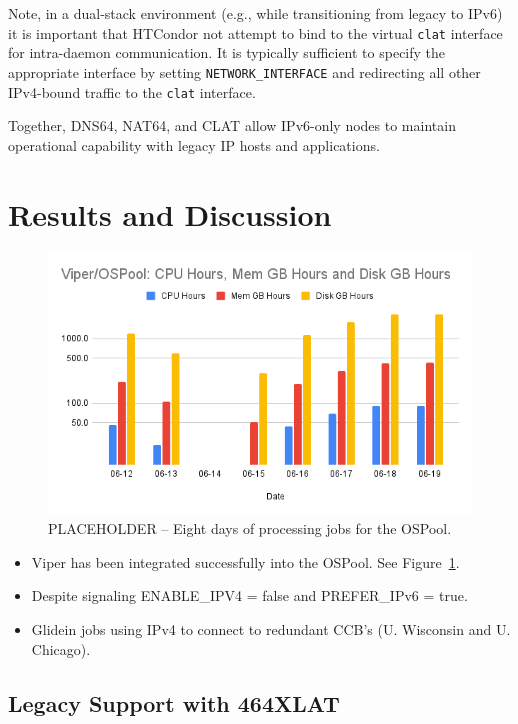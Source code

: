 \documentclass[11pt]{article}
\begin{document}
Note, in a dual-stack environment (e.g., while transitioning from legacy to IPv6) it is important that HTCondor not attempt to bind to the virtual \texttt{clat} interface for intra-daemon communication. It is typically sufficient to specify the appropriate interface by setting \texttt{NETWORK\_INTERFACE} and redirecting all other IPv4-bound traffic to the \texttt{clat} interface.  


Together, DNS64, NAT64, and CLAT allow IPv6-only nodes to maintain operational capability with legacy IP hosts and applications. 

\section{Results and Discussion}

\begin{figure}[htbp]
  \centering
  \includegraphics[width=0.74\linewidth]{Viper_OSPool_utilization.png}
  \caption{PLACEHOLDER -- Eight days of processing jobs for the OSPool.}
  \label{fig:viper-jobs}
\end{figure}


\begin{itemize}
\item Viper has been integrated successfully into the OSPool. See Figure~\ref{fig:viper-jobs}. 
\item Despite signaling ENABLE\_IPV4 = false and PREFER\_IPv6 = true.
\item Glidein jobs using IPv4 to connect to redundant CCB's (U. Wisconsin and U. Chicago).
\end{itemize}

\subsection{Legacy Support with 464XLAT}
\end{document}
